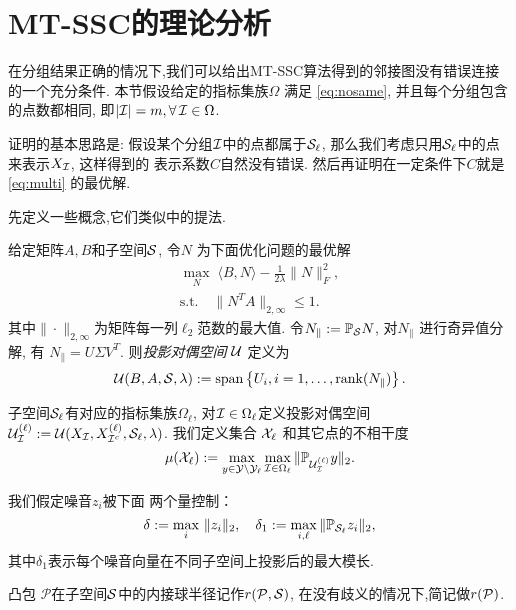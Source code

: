 \section{MT-SSC的理论分析}\label{sec:proof_multi}
在分组结果正确的情况下,我们可以给出MT-SSC算法得到的邻接图没有错误连接
的一个充分条件. 本节假设给定的指标集族\(\Omega\) 满足 \eqref{eq:nosame},   
并且每个分组包含的点数都相同, 即\(|\mathcal{I}|=m, \forall\, \mathcal{I} \in \Omega\).

证明的基本思路是: 假设某个分组\(\mathcal{I}\)中的点都属于\(\mathcal{S}_\ell\),
那么我们考虑只用\(\mathcal{S}_\ell\)中的点来表示\(X_{\mathcal{I}}\), 这样得到的
表示系数\(C\)自然没有错误. 然后再证明在一定条件下\(C\)就是 \eqref{eq:multi} 
的最优解.

先定义一些概念,它们类似\cite{soltanolkotabi2012geometric}中的提法.
\begin{definition}[投影对偶空间]\label{def:proj_dual_direction}
  给定矩阵\(A,B\)和子空间\(\mathcal{S}\), 令\(N\) 为下面优化问题的最优解
  \begin{gather*}
    \max_{N} \; \langle B, N \rangle - \frac{1}{2\lambda}\|N\|_F^2,\\
    \text{s.t.}\quad \|N^T A\|_{2, \infty} \leq 1.
  \end{gather*}
  其中\(\|\cdot\|_{2,\infty}\)为矩阵每一列\(\ell_2\)范数的最大值.
  令\( N_\parallel := \mathbb{P}_{\mathcal{S}} N\), 对\(N_\parallel\) 进行奇异值分解, 有
  \( N_\parallel = U \Sigma V^T\). 则\emph{投影对偶空间} \(\mathcal{U}\) 定义为
  \[\mathcal{U}(B,A,\mathcal{S},\lambda):= \operatorname*{span} \left\{U_i, i = 1,\ldots, \operatorname{rank}(N_\parallel)
  \right\}.\]
\end{definition}

\begin{definition}[子空间的不相干度]\label{def:incoherence}
  子空间\(\mathcal{S}_\ell\)有对应的指标集族\(\Omega_\ell\), 
  对\(\mathcal{I}\in \Omega_\ell\)定义投影对偶空间 \(\mathcal{U}_{\mathcal{I}}^{(\ell)}:=\mathcal{U}(X_{\mathcal{I}},
  X_{\mathcal{I}^c}^{(\ell)},\mathcal{S}_{\ell},\lambda)\).
  我们定义集合 \(\mathcal{X}_\ell\) 和其它点的不相干度
  \[
     \mu(\mathcal{X}_{\ell}) := \max_{y\in \mathcal{Y}\setminus \mathcal{Y}_{\ell}}
     \max_{\mathcal{I} \in \Omega_\ell} \|\mathbb{P}_{\mathcal{U}_{\mathcal{I}}^{(\ell)}} y\|_2. 
   \]
\end{definition} 

\begin{definition}[控制噪音]\label{def:noise} 
  我们假定噪音\(z_i\)被下面 两个量控制： 
  \[ \delta:=\max_i\, \|z_i\|_2, \quad \delta_1:=\max_{i,\ell} \|\mathbb{P}_{\mathcal{S}_\ell} z_i\|_2,\]
其中\(\delta_1\)表示每个噪音向量在不同子空间上投影后的最大模长.  
\end{definition} 

\begin{definition}[内接球半径] 凸包 \(\mathcal{P}\)在子空间\(\mathcal{S}\)中的内接球半径记作\(r(\mathcal{P},\mathcal{S})\),
  在没有歧义的情况下,简记做\(r(\mathcal{P})\). 
\end{definition}

